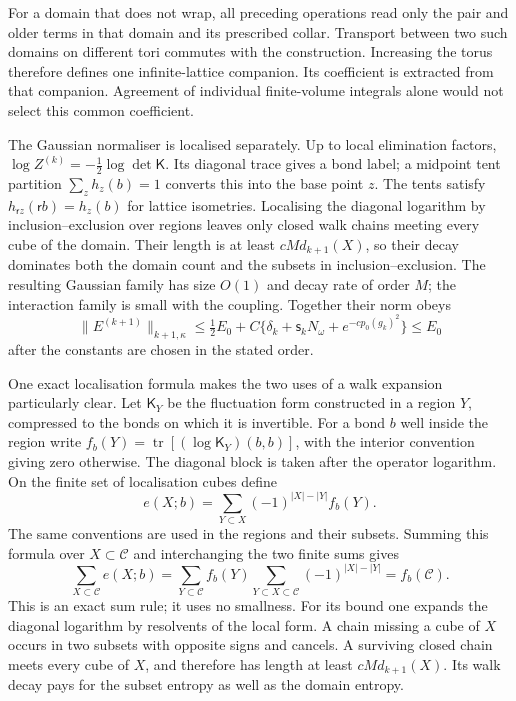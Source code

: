 \documentclass[11pt,letterpaper,reqno]{amsart}
\theoremstyle{definition}
\theoremstyle{remark}
\begin{document}
For a domain that does not wrap, all preceding operations
read only the pair and older terms in that domain and its
prescribed collar. Transport between two such domains on
different tori commutes with the construction. Increasing
the torus therefore defines one infinite-lattice companion.
Its coefficient is extracted from that companion. Agreement
of individual finite-volume integrals alone would not select
this common coefficient.

The Gaussian normaliser is localised separately. Up to local
elimination factors,
$\log Z^{(k)}=-\frac12\log\det\mathsf K$.
Its diagonal trace gives a bond label; a midpoint tent partition
$\sum_z h_z(b)=1$ converts this into the base point $z$.
The tents satisfy
$h_{\mathsf rz}(\mathsf rb)=h_z(b)$ for lattice isometries.
Localising the diagonal logarithm by inclusion--exclusion over
regions leaves only closed walk chains meeting every cube of the
domain. Their length is at least $cM d_{k+1}(X)$, so their decay
dominates both the domain count and the subsets in
inclusion--exclusion. The resulting Gaussian family has size $O(1)$
and decay rate of order $M$; the interaction family is small with
the coupling. Together their norm obeys
\[
 \|E^{(k+1)}\|_{k+1,\kappa}
 \le \tfrac12E_0+
 C\{\delta_k+\mathsf s_kN_\omega+e^{-cp_0(g_k)^2}\}
 \le E_0
\]
after the constants are chosen in the stated order.

One exact localisation formula makes the two uses of a walk
expansion particularly clear. Let $\mathsf K_Y$ be the
fluctuation form constructed in a region $Y$, compressed to
the bonds on which it is invertible. For a bond $b$ well
inside the region write
$f_b(Y)=\operatorname{tr}[(\log\mathsf K_Y)(b,b)]$, with the
interior convention giving zero otherwise. The diagonal block is taken
after the operator logarithm. On the finite
set of localisation cubes define
\begin{equation}\label{eq:mrg-logdet-mobius}
 e(X;b)=\sum_{Y\subset X}(-1)^{|X|-|Y|}f_b(Y).
\end{equation}
The same conventions are used in the regions and their
subsets. Summing this formula over $X\subset\mathcal C$
and interchanging the two finite sums gives
\[
 \sum_{X\subset\mathcal C}e(X;b)
 =\sum_{Y\subset\mathcal C}f_b(Y)
     \sum_{Y\subset X\subset\mathcal C}(-1)^{|X|-|Y|}
 =f_b(\mathcal C).
\]
This is an exact sum rule; it uses no smallness.
For its bound one expands the diagonal logarithm by resolvents
of the local form. A chain missing a cube of $X$ occurs in
two subsets with opposite signs and cancels. A surviving
closed chain meets every cube of $X$, and therefore has
length at least $cMd_{k+1}(X)$. Its walk decay pays for the
subset entropy as well as the domain entropy.
\end{document}
